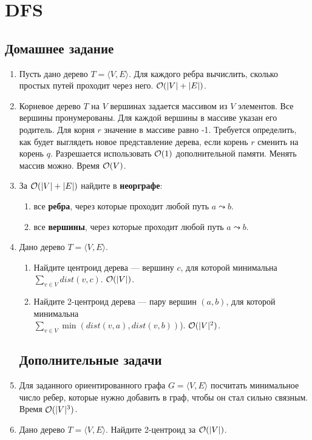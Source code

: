 \section{DFS}

\subsection{Домашнее задание}
\begin{enumerate}
  \item
    Пусть дано дерево $T = \langle V, E \rangle$. Для каждого ребра вычислить, сколько
    простых путей проходит через него. $\mathcal{O}(|V| + |E|)$.

  \item
    Корневое дерево $T$ на $V$ вершинах задается массивом
    из $V$ элементов. Все вершины пронумерованы. Для каждой вершины
    в массиве указан его родитель.  Для корня $r$ значение в массиве
    равно -1. Требуется определить, как будет выглядеть новое представление
    дерева, если корень $r$ сменить на корень $q$. Разрешается использовать
    $\mathcal{O}(1)$ дополнительной памяти. Менять массив можно. Время $\mathcal{O}(V)$.

  \item
    За $\mathcal{O}(|V| + |E|)$ найдите в \textbf{неорграфе}:
    \begin{enumerate}
      \item все \textbf{ребра}, через которые проходит любой путь $a \leadsto b$.
      \item все \textbf{вершины}, через которые проходит любой путь $a \leadsto b$.
    \end{enumerate}

  \item
    Дано дерево $T = \langle V, E \rangle$.
    \begin{enumerate}
      \item
        Найдите центроид дерева --- вершину $c$, для которой минимальна \\
        $\sum_{v \in V} dist(v, c)$. $\mathcal{O}(|V|)$.

      \item
        Найдите 2-центроид дерева --- пару вершин $(a, b)$, для которой минимальна \\
        $\sum_{v \in V}\min(dist(v, a), dist(v, b))$). $\mathcal{O}(|V|^2)$.
    \end{enumerate}

\subsection*{Дополнительные задачи}

  \item
    Для заданного ориентированного графа $G = \langle V, E \rangle$ посчитать
    минимальное число ребер, которые нужно добавить в граф, чтобы
    он стал сильно связным. Время $\mathcal{O}(|V|^3)$.

   \item
    Дано дерево $T = \langle V, E \rangle$. Найдите 2-центроид за $\mathcal{O}(|V|)$.

\end{enumerate}

